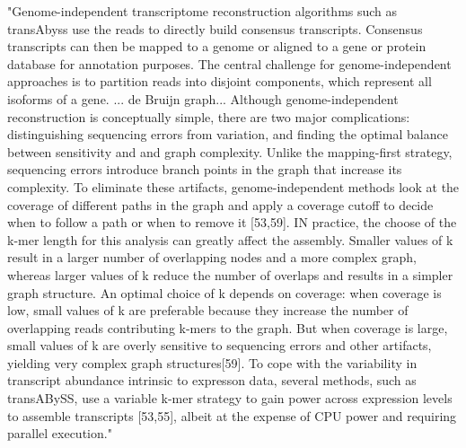 \documentclass[10pt]{article}
\begin{document}
"Genome-independent transcriptome reconstruction algorithms such as transAbyss use the reads to directly build consensus transcripts.  Consensus transcripts can then be mapped to a genome or aligned to a gene or protein database for annotation purposes.  The central challenge for genome-independent approaches is to partition reads into disjoint components, which represent all isoforms of a gene.  ... de Bruijn graph...  Although genome-independent reconstruction is conceptually simple, there are two major complications: distinguishing sequencing errors from variation, and finding the optimal balance between sensitivity and and graph complexity.  Unlike the mapping-first strategy, sequencing errors introduce branch points in the graph that increase its complexity.  To eliminate these artifacts, genome-independent methods look at the coverage of different paths in the graph and apply a coverage cutoff to decide when to follow a path or when to remove it [53,59].  IN practice, the choose of the k-mer length for this analysis can greatly affect the assembly.  Smaller values of k result in a larger number of overlapping nodes and a more complex graph, whereas larger values of k reduce the number of overlaps and results in a simpler graph structure.  An optimal choice of k depends on coverage: when coverage is low, small values of k are preferable because they increase the number of overlapping reads contributing k-mers to the graph.  But when coverage is large, small values of k are overly sensitive to sequencing errors and other artifacts, yielding very complex graph structures[59].  To cope with the variability in transcript abundance intrinsic to expresson data, several methods, such as transABySS, use a variable k-mer strategy to gain power across expression levels to assemble transcripts [53,55], albeit at the expense of CPU power and requiring parallel execution."
\end{document}
